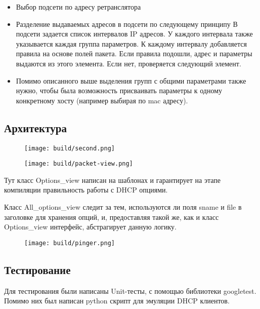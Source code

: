 \documentclass[12pt]{article}
\begin{document}
\begin{itemize}
    \item Выбор подсети по адресу ретранслятора
    \item Разделение выдаваемых адресов в подсети по следующему принципу
        \subitem В подсети задается список интервалов IP адресов.
        \subitem У каждого интервала также указывается каждая группа параметров.
        \subitem К каждому интервалу добавляется правила на основе полей пакета.
        \subitem Если правила подошли, адрес и параметры выдаются из этого элемента.
        \subitem Если нет, проверяется следующий элемент.
    \item Помимо описанного выше выделения групп с общими параметрами также нужно, чтобы была возможность присваивать параметры к одному конкретному хосту (например выбирая по mac адресу).
\end{itemize}

\subsection{Архитектура}

\begin{figure}[H]
    \texttt{[image: build/second.png]}
    \caption{}
\end{figure}

\begin{figure}[H]
    \texttt{[image: build/packet-view.png]}
    \caption{}
\end{figure}

Тут класс Options\_view написан на шаблонах и гарантирует на этапе компиляции правильность работы с DHCP опциями.

Класс All\_options\_view следит за тем, используются ли поля sname и file в заголовке для хранения опций, и, предоставляя такой же, как и класс Options\_view интерфейс, абстрагирует данную логику.

\begin{figure}[H]
    \texttt{[image: build/pinger.png]}
    \caption{}
\end{figure}

\pagebreak
\subsection{Тестирование}

Для тестирования были написаны Unit-тесты, с помощью библиотеки googletest.
Помимо них был написан python скрипт для эмуляции DHCP клиентов.
\end{document}
